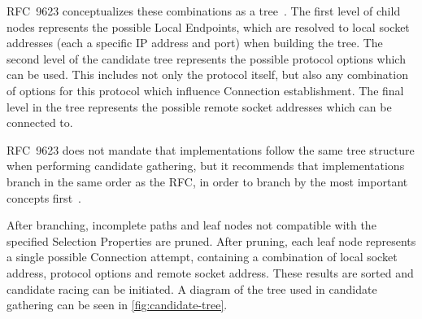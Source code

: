 RFC~9623 conceptualizes these combinations as a tree~\cite[sec.~4.2]{rfc9623}.
The first level of child nodes represents the
possible Local Endpoints, which are resolved to local socket addresses
(each a specific IP address and port) when building the tree.
The second level of the candidate tree represents the possible protocol
options which can be used. This includes not only the protocol
itself, but also any combination of options for this protocol which
influence Connection establishment. The final level in the
tree represents the possible remote socket addresses which can
be connected to.

RFC~9623 does not mandate that implementations follow the same tree
structure when performing candidate gathering, but it recommends that implementations
branch in the
same order as the RFC, in order to branch by the most important concepts
first~\cite[sec.~4.1.2]{rfc9623}.

After branching, incomplete paths and leaf nodes
not compatible with the specified Selection Properties are
pruned. After pruning, each leaf node represents a single possible
Connection attempt, containing a combination of local socket address, 
protocol options and remote socket address. These results are
sorted and candidate racing can be initiated.
A diagram of the tree used in candidate gathering can be seen in
\cref{fig:candidate-tree}.

